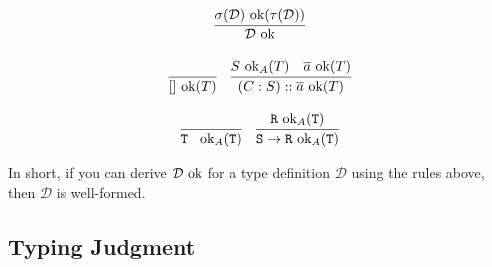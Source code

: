 \documentclass[10pt]{article}
\begin{document}
\[
  \begin{array}{c}
    \infer{\mathcal{D} \ok}{\sigma(\mathcal{D}) \ok(\tau(\mathcal{D}))}
    \\\\

    \infer{[] \ok(T)}{}
    ~~~
    \infer{(C : S) :: \overline{a} \ok(T)}{S \ok_A(T) & \overline{a} \ok(T) }
    \\\\
    \infer{\ttt{T }\ok_A(\ttt{T})}{}
    ~~~
    \infer{\ttt{S} \ra \ttt{R} \ok_A(\ttt{T})}{\ttt{R} \ok_A(\ttt{T})}
  \end{array}
\]

\noindent
In short, if you can derive $\mathcal{D}\textnormal{ ok}$ for a type definition $\mathcal{D}$ using the rules above, then $\mathcal{D}$ is well-formed.

\subsection{Typing Judgment}
\end{document}
